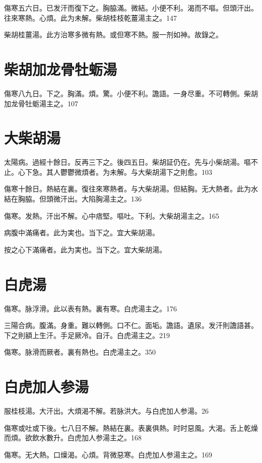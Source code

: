 傷寒五六日。已发汗而復下之。胸脇滿。微結。小便不利。渴而不嘔。但頭汗出。往來寒熱。心煩。此为未解。柴胡桂枝乾薑湯主之。147

柴胡桂薑湯。此方治寒多微有熱。或但寒不熱。服一剂如神。故錄之。

\section{柴胡加龙骨牡蛎湯}

傷寒八九日。下之。胸滿。煩。驚。小便不利。譫語。一身尽重。不可轉側。柴胡加龙骨牡蛎湯主之。107

\section{大柴胡湯}

太陽病。過經十餘日。反再三下之。後四五日。柴胡証仍在。先与小柴胡湯。嘔不止。心下急。其人鬱鬱微煩者。为未解。与大柴胡湯下之則愈。103

傷寒十餘日。熱結在裏。復往來寒熱者。与大柴胡湯。但結胸。无大熱者。此为水結在胸脇。{\khaaitp 但}頭微汗出。大陷胸湯主之。136

傷寒。发熱。汗出不解。心中痞堅。嘔吐。下利。大柴胡湯主之。165

病腹中滿痛者。此为実也。当下之。宜大柴胡湯。{\wuben}

按之心下滿痛者。此为実也。当下之。宜大柴胡湯。{\dengben}


\section{白虎湯}

傷寒。脉浮滑。此以表有熱。裏有寒。白虎湯主之。176

三陽合病。腹滿。身重。難以轉側。口不仁。面垢。譫語。遺尿。发汗則譫語{\khaaitp 甚}。下之則額上生汗。手足厥冷。自汗。白虎湯主之。219

傷寒。脉滑而厥者。裏有熱也。白虎湯主之。350

\section{白虎加人参湯}

服桂枝湯。大汗出。大煩渴不解。若脉洪大。与白虎{\khaaitp 加人参}湯。26

傷寒或吐或下後。七八日不解。熱結在裏。表裏俱熱。时时惡風。大渴。舌上乾燥而煩。欲飲水數升。白虎{\khaaitp 加人参}湯主之。168

傷寒。无大熱。口燥渴。心煩。背微惡寒。白虎{\khaaitp 加人参}湯主之。169

